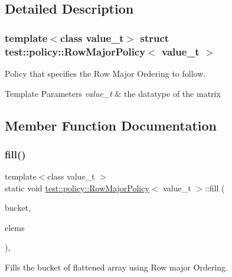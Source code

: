 \subsection{Detailed Description}
\subsubsection*{template$<$class value\+\_\+t$>$\newline
struct test\+::policy\+::\+Row\+Major\+Policy$<$ value\+\_\+t $>$}

Policy that specifies the Row Major Ordering to follow. 


\begin{DoxyTemplParams}{Template Parameters}
{\em value\+\_\+t} & the datatype of the matrix \\
\hline
\end{DoxyTemplParams}


\subsection{Member Function Documentation}
\mbox{\label{structtest_1_1policy_1_1RowMajorPolicy_a68968039746ed1ba42d2931785290d21}} 
\subsubsection{\texorpdfstring{fill()}{fill()}}
{\footnotesize\ttfamily template$<$class value\+\_\+t $>$ \\
static void \mbox{\hyperlink{structtest_1_1policy_1_1RowMajorPolicy}{test\+::policy\+::\+Row\+Major\+Policy}}$<$ value\+\_\+t $>$\+::fill (\begin{DoxyParamCaption}\item[{std\+::vector$<$ value\+\_\+t $>$ \&}]{bucket,  }\item[{std\+::vector$<$ std\+::vector$<$ value\+\_\+t $>$$>$ const \&}]{elems }\end{DoxyParamCaption})\hspace{0.3cm}{\ttfamily [inline]}, {\ttfamily [static]}}



Fills the bucket of flattened array using Row major Ordering. 


